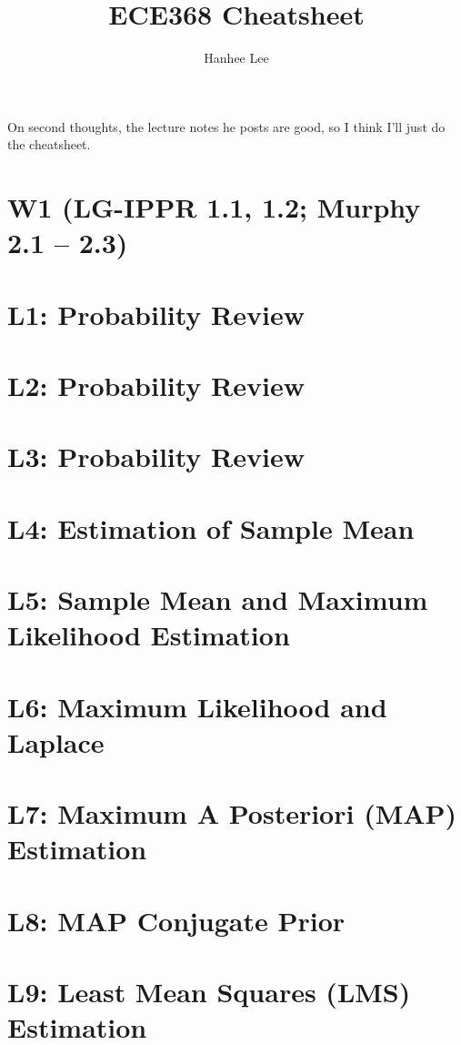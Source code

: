 \documentclass{article}
\title{ECE368 Cheatsheet}
\author{Hanhee Lee}
\begin{document}
\maketitle

\tableofcontents

\begin{summary}
    On second thoughts, the lecture notes he posts are good, so I think I'll just do the cheatsheet. 
\end{summary}
\section*{W1 (LG-IPPR 1.1, 1.2; Murphy 2.1 – 2.3)}
\section{L1: Probability Review}

\newpage

\section{L2: Probability Review}

\newpage

\section{L3: Probability Review}

\cleardoublepage

\section{L4: Estimation of Sample Mean}

\newpage

\section{L5: Sample Mean and Maximum Likelihood Estimation}

\newpage

\section{L6: Maximum Likelihood and Laplace}

\newpage

\section{L7: Maximum A Posteriori (MAP) Estimation} 

\newpage

\section{L8: MAP Conjugate Prior}
 
\newpage

\section{L9: Least Mean Squares (LMS) Estimation}
 
\newpage
\end{document}
